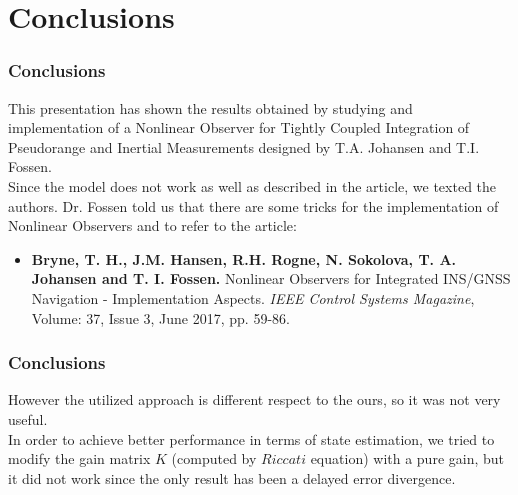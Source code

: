 \documentclass{beamer}
\begin{document}
	\section{Conclusions}
		\begin{frame}
		\frametitle{Conclusions}
		This presentation has shown the results obtained by studying and implementation
		of a Nonlinear Observer for Tightly Coupled Integration of Pseudorange and Inertial Measurements
		designed by T.A. Johansen and T.I. Fossen.\\
		
		Since the model does not work as well as described in the article, we texted the authors. Dr. Fossen told us that there are some tricks for the implementation of Nonlinear Observers and to refer to the article:
		\begin{itemize}
			\item \textbf{Bryne, T. H., J.M. Hansen, R.H. Rogne, N. Sokolova, T. A. Johansen and T. I. Fossen. } Nonlinear Observers for Integrated INS/GNSS Navigation - Implementation Aspects. \textit{IEEE Control Systems Magazine}, Volume: 37, Issue 3, June 2017, pp. 59-86.
		\end{itemize} 
		\end{frame}
		
		\begin{frame}
			\frametitle{Conclusions}
			However the utilized approach is different respect to the ours, so it was not very useful.\\
			\vspace{0.3cm}
			In order to achieve better performance in terms of state estimation, we tried to modify the gain matrix $K$ (computed by $Riccati$ equation) with a pure gain, but it did not work since the only result has been a delayed error divergence.			
		\end{frame}
		
		
		
		
\end{document}
